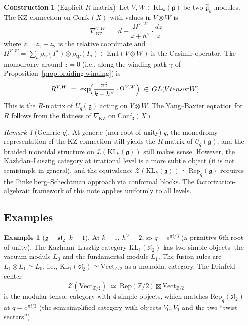 \documentclass[11pt]{article}
\theoremstyle{definition}
\newtheorem{construction}[theorem]{Construction}
\newtheorem{example}[theorem]{Example}
\theoremstyle{remark}
\newtheorem{remark}[theorem]{Remark}
\newcommand{\Rep}{\mathrm{Rep}}
\newcommand{\Vect}{\mathrm{Vect}}
\newcommand{\Uq}{U_q}
\newcommand{\End}{\mathrm{End}}
\newcommand{\cZ}{\mathcal{Z}}
\newcommand{\frakg}{\mathfrak{g}}
\newcommand{\KL}{\mathrm{KL}}
\newcommand{\Conf}{\mathrm{Conf}}
\begin{document}
\begin{construction}[Explicit $R$-matrix]
\label{constr:r-matrix-kz}
Let $V, W \in \KL_k(\frakg)$ be two $\hat{\frakg}_k$-modules. The KZ connection on $\Conf_2(X)$ with values in $V \otimes W$ is
\[
 \nabla_{\mathrm{KZ}}^{V,W} \;=\; d - \frac{\Omega^{V,W}}{k + h^\vee} \cdot \frac{dz}{z}
\]
where $z = z_1 - z_2$ is the relative coordinate and $\Omega^{V,W} = \sum_a \rho_V(I^a) \otimes \rho_W(I_a) \in \End(V \otimes W)$ is the Casimir operator. The monodromy around $z = 0$ (i.e., along the winding path $\gamma$ of Proposition~\ref{prop:braiding-winding}) is
\[
 R^{V,W} \;=\; \exp\!\Bigl(\frac{\pi i}{k + h^\vee} \cdot \Omega^{V,W}\Bigr) \;\in\; \mathrm{GL}(V \otimes W).
\]
This is the $R$-matrix of $\Uq(\frakg)$ acting on $V \otimes W$. The Yang--Baxter equation for $R$ follows from the flatness of $\nabla_{\mathrm{KZ}}$ on $\Conf_3(X)$.
\end{construction}

\begin{remark}[Generic $q$]
\label{rem:generic-q}
At generic (non-root-of-unity) $q$, the monodromy representation of the KZ connection still yields the $R$-matrix of $\Uq(\frakg)$, and the braided monoidal structure on $\cZ(\KL_k(\frakg))$ still makes sense. However, the Kazhdan--Lusztig category at irrational level is a more subtle object (it is not semisimple in general), and the equivalence $\cZ(\KL_k(\frakg)) \simeq \Rep_q(\frakg)$ requires the Finkelberg--Schechtman approach via conformal blocks. The factorization-algebraic framework of this note applies uniformly to all levels.
\end{remark}


\subsection{Examples}

\begin{example}[$\frakg = \mathfrak{sl}_2$, $k = 1$]
\label{ex:sl2-level1}
At $k = 1$, $h^\vee = 2$, so $q = e^{\pi i / 3}$ (a primitive 6th root of unity). The Kazhdan--Lusztig category $\KL_1(\mathfrak{sl}_2)$ has two simple objects: the vacuum module $L_0$ and the fundamental module $L_1$. The fusion rules are $L_1 \otimes L_1 \simeq L_0$, i.e., $\KL_1(\mathfrak{sl}_2) \simeq \Vect_{\mathbb{Z}/2}$ as a monoidal category. The Drinfeld center
\[
 \cZ(\Vect_{\mathbb{Z}/2}) \;\simeq\; \Rep(\mathbb{Z}/2) \boxtimes \Vect_{\mathbb{Z}/2}
\]
is the modular tensor category with 4 simple objects, which matches $\Rep_q(\mathfrak{sl}_2)$ at $q = e^{\pi i/3}$ (the semisimplified category with objects $V_0, V_1$ and the two ``twist sectors'').
\end{example}
\end{document}
